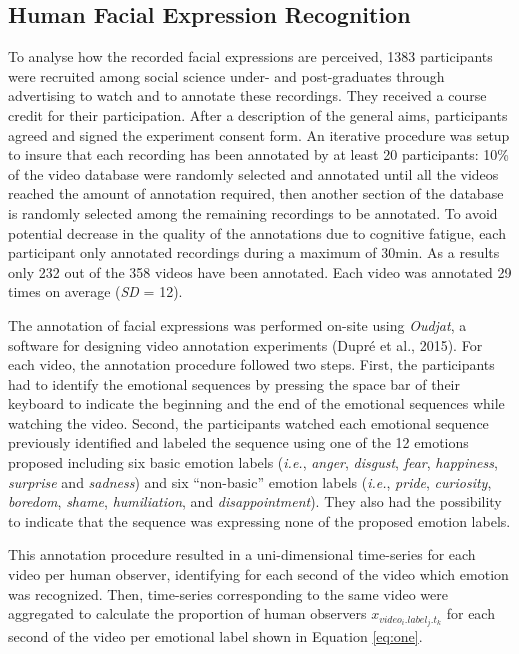 \documentclass[
  english,
  doc]{apa7}
\begin{document}
\hypertarget{human-facial-expression-recognition}{%
\subsection{Human Facial Expression Recognition}\label{human-facial-expression-recognition}}

To analyse how the recorded facial expressions are perceived, 1383 participants were recruited among social science under- and post-graduates through advertising to watch and to annotate these recordings. They received a course credit for their participation. After a description of the general aims, participants agreed and signed the experiment consent form. An iterative procedure was setup to insure that each recording has been annotated by at least 20 participants: 10\% of the video database were randomly selected and annotated until all the videos reached the amount of annotation required, then another section of the database is randomly selected among the remaining recordings to be annotated. To avoid potential decrease in the quality of the annotations due to cognitive fatigue, each participant only annotated recordings during a maximum of 30min. As a results only 232 out of the 358 videos have been annotated. Each video was annotated 29 times on average (\emph{SD} = 12).

The annotation of facial expressions was performed on-site using \emph{Oudjat}, a software for designing video annotation experiments (Dupré et al., 2015). For each video, the annotation procedure followed two steps. First, the participants had to identify the emotional sequences by pressing the space bar of their keyboard to indicate the beginning and the end of the emotional sequences while watching the video. Second, the participants watched each emotional sequence previously identified and labeled the sequence using one of the 12 emotions proposed including six basic emotion labels (\emph{i.e.}, \emph{anger}, \emph{disgust}, \emph{fear}, \emph{happiness}, \emph{surprise} and \emph{sadness}) and six ``non-basic'' emotion labels (\emph{i.e.}, \emph{pride}, \emph{curiosity}, \emph{boredom}, \emph{shame}, \emph{humiliation}, and \emph{disappointment}). They also had the possibility to indicate that the sequence was expressing none of the proposed emotion labels.

This annotation procedure resulted in a uni-dimensional time-series for each video per human observer, identifying for each second of the video which emotion was recognized. Then, time-series corresponding to the same video were aggregated to calculate the proportion of human observers \(x_{video_{i}.label_{j}.t_{k}}\) for each second of the video per emotional label shown in Equation \eqref{eq:one}.
\end{document}
